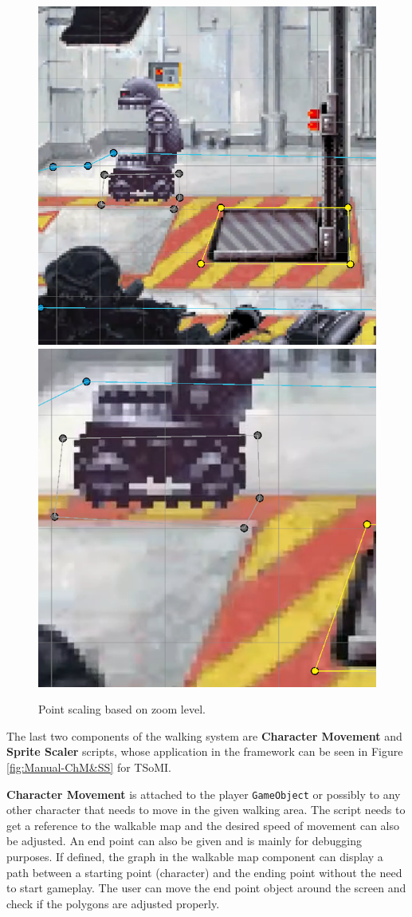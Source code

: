 \begin{figure}[H]
\centering
\includegraphics[width=.48\linewidth]{img/User doc/point_scaling.png}
\includegraphics[width=.48\linewidth]{img/User doc/point_scaling2.png}
\caption{Point scaling based on zoom level.}
\label{fig:Manual-Zoom}
\end{figure}
The last two components of the walking system are \textbf{Character Movement} and \textbf{Sprite Scaler} scripts, whose application in the framework can be seen in Figure \ref{fig:Manual-ChM&SS} for TSoMI. 

\textbf{Character Movement} is attached to the player \verb|GameObject| or possibly to any other character that needs to move in the given walking area. The script needs to get a reference to the walkable map and the desired speed of movement can also be adjusted. An end point can also be given and is mainly for debugging purposes. If defined, the graph in the walkable map component can display a path between a starting point (character) and the ending point without the need to start gameplay. The user can move the end point object around the screen and check if the polygons are adjusted properly.

